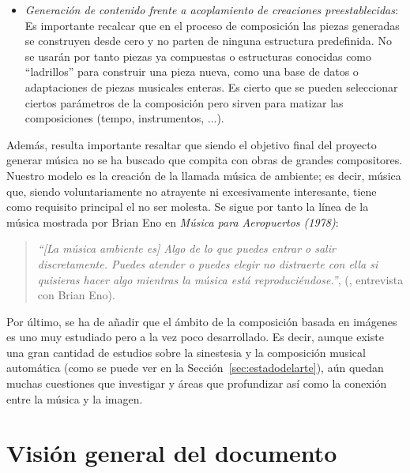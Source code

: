 \begin{itemize}
		\item \emph{Generación de contenido frente a acoplamiento de creaciones preestablecidas}:
			\vspace{0.1in}
			\\Es importante recalcar que en el proceso de composición las piezas generadas se construyen desde cero y no parten de ninguna estructura predefinida. No se usarán por tanto piezas ya compuestas o estructuras conocidas como ``ladrillos'' para construir una pieza nueva, como una base de datos o adaptaciones de piezas musicales enteras. Es cierto que se pueden seleccionar ciertos parámetros de la composición pero sirven para matizar las composiciones (tempo, instrumentos, ...).
		\end{itemize}
		
		Además, resulta importante resaltar que siendo el objetivo final del proyecto generar música no se ha buscado que compita con obras de grandes compositores. Nuestro modelo es la creación de la llamada música de ambiente; es decir, música que, siendo voluntariamente no atrayente ni excesivamente interesante, tiene como requisito principal el no ser molesta. Se sigue por tanto la línea de la música mostrada por Brian Eno en \emph{Música para Aeropuertos (1978)}:
		
		\begin{quote}
		\emph{``[La música ambiente es] Algo de lo que puedes entrar o salir discretamente. Puedes atender o puedes elegir no distraerte con ella si quisieras hacer algo mientras la música está reproduciéndose.''}, (\cite{BrianEnoInterview}, entrevista con Brian Eno).
		\end{quote}		
		
		Por último, se ha de añadir que el ámbito de la composición basada en imágenes es uno muy estudiado pero a la vez poco desarrollado. Es decir, aunque existe una gran cantidad de estudios sobre la sinestesia y la composición musical automática (como se puede ver en la Sección~\ref{sec:estadodelarte}), aún quedan muchas cuestiones que investigar y áreas que profundizar así como la conexión entre la música y la imagen.\\




\section{Visión general del documento}

